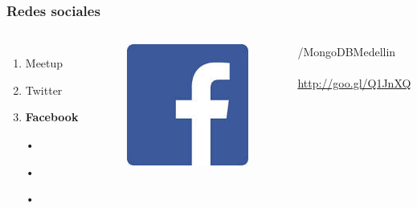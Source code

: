 \documentclass{beamer}
\begin{document}
\begin{frame}
\frametitle{Redes sociales}
\begin{columns}[c] %

\begin{enumerate}
\item Meetup
\item Twitter
\item \textbf{Facebook}
\item[•]	
\item[•]	
\item[•]	
\end{enumerate}

\begin{figure}
\includegraphics[width=0.5\linewidth]{facebook.png}
\end{figure}
{\color{blue}/MongoDBMedellin}
\\~\\
{\color{blue}\url{http://goo.gl/Q1JnXQ}}
\end{columns}
\end{frame}
\end{document}
